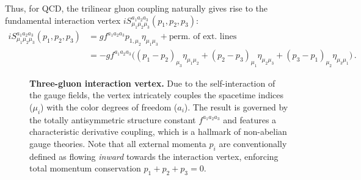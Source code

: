 Thus, for QCD, the trilinear gluon coupling naturally gives rise to the fundamental interaction vertex \(iS^{a_1 a_2 a_3}_{\mu_1 \mu_2 \mu_3}(p_1, p_2, p_3)\):
\begin{equation} \label{eq:three_gluon_vertex}
    \begin{aligned}
        iS^{a_1 a_2 a_3}_{\mu_1 \mu_2 \mu_3}(p_1, p_2, p_3) & = g f^{a_1 a_2 a_3} p_{1,\mu_2} \eta_{\mu_1 \mu_3} + \text{perm. of ext. lines}                                                                                \\
                                                            & = -g f^{a_1 a_2 a_3} \Big( (p_1 - p_2)_{\mu_3} \eta_{\mu_1 \mu_2} + (p_2 - p_3)_{\mu_1} \eta_{\mu_2 \mu_3} + (p_3 - p_1)_{\mu_2} \eta_{\mu_3 \mu_1} \Big) \, .
    \end{aligned}
\end{equation}

\begin{figure}[H]
    \centering
    \begin{minipage}{0.45\textwidth}
        \centering
    \end{minipage}
    \hfill
    \begin{minipage}{0.5\textwidth}
        \caption{\textbf{Three-gluon interaction vertex.}
            Due to the self-interaction of the gauge fields, the vertex intricately couples the spacetime indices (\(\mu_i\)) with the color degrees of freedom (\(a_i\)). The result is governed by the totally antisymmetric structure constant \(f^{a_1 a_2 a_3}\) and features a characteristic derivative coupling, which is a hallmark of non-abelian gauge theories. Note that all external momenta \(p_i\) are conventionally defined as flowing \textit{inward} towards the interaction vertex, enforcing total momentum conservation \(p_1 + p_2 + p_3 = 0\).}
        \label{fig:three_gluon_vertex_detail}

    \end{minipage}
\end{figure}

